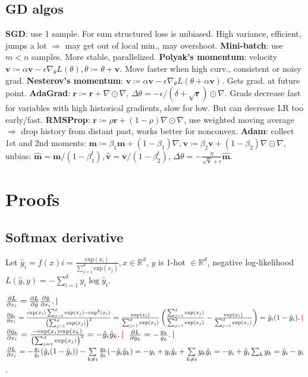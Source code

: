 \documentclass[11pt,landscape,a4paper,fleqn]{article}
\newcommand{\R}{\mathbb{R}}
\renewcommand{\exp}{\mathrm{exp}}
\newcommand{\sep}{\,\textcolor{red}{\bm|}\,}
\def\myvector#1{\mathbf{#1}}
\def\vm{{\myvector{m}}}
\def\vr{{\myvector{r}}}
\def\vv{{\myvector{v}}}
\begin{document}
\begin{multicols*}{4}
\subsection{GD algos}

\textbf{SGD}: use 1 sample.
For sum structured loss is unbiased.
High variance, efficient, jumps a lot $ \Rightarrow $ may get out of local min.,
may overshoot.
\textbf{Mini-batch}: use $m < n$ samples.
More stable, parallelized.
\textbf{Polyak's momentum}: velocity $\vv \coloneqq \alpha \vv - \epsilon \nabla_\theta L(\theta), \theta \coloneqq \theta + \vv$.
Move faster when high curv., consistent or noisy grad.
\textbf{Nesterov's momentum}: $\vv \coloneqq \alpha \vv - \epsilon \nabla_\theta L(\theta + \alpha \vv)$.
Gets grad. at future point.
\textbf{AdaGrad}: $\vr \coloneqq \vr + \nabla \odot \nabla$, $\Delta \theta = - \epsilon / (\delta + \sqrt{\vr})
\odot \nabla$.
Grads decrease fast for variables with high historical gradients,
slow for low. But can decrease LR too early/fast.
\textbf{RMSProp}: $\vr \coloneqq \rho \vr + (1 - \rho) \nabla \odot \nabla$,
use weighted moving average $ \Rightarrow $ drop history from distant past,
works better for nonconvex.
\textbf{Adam}: collect 1st and 2nd moments:
$\vm \coloneqq \beta_1 \vm + (1 - \beta_1) \nabla, \vv \coloneqq \beta_2 \vv + (1 - \beta_2) \nabla \odot \nabla$,
unbias:
$\hat{\vm} = \vm / (1 - \beta_1^t), \hat{\vv} = \vv / (1 - \beta_2^t)$,
$\Delta \theta =- \frac{\eta}{\sqrt{\hat{\vv}} + \epsilon}\hat{\vm}$.



\section{Proofs}

\subsection*{Softmax derivative}

Let $\hat{y}_i = f(x)i = \frac{\exp(x_i)}{\sum_{j = 1}^d \exp(x_j)}, x \in \R^d$,
$y$ is 1-hot $\in \R^d$,
negative log-likelihood
$L(\hat{y}, y) = - \sum_{i = 1}^d y_i \log \hat{y}_i$.

$\pdv{L}{x_i} = \pdv{L}{\hat{y}} \pdv{\hat{y}}{x_i}.\sep$
$\pdv{\hat{y}_i}{x_i} = \frac{\exp(x_i) \sum_{j = 1}^d \exp(x_j) - \exp^2(x_i)}{\left(\sum_{j = 1}^d \exp(x_j)\right)^2}
= \frac{\exp(x_i)}{\sum_{j = 1}^d \exp(x_j)} \left(\frac{\sum_{j = 1}^d \exp(x_j)}{\sum_{j = 1}^d \exp(x_j)} - \frac{\exp(x_i)}{\sum_{j = 1}^d \exp(x_j)}\right) = \hat{y}_i(1 - \hat{y}_i). \sep$
$\pdv{\hat{y}_k}{x_i} = \frac{ - \exp(x_i)\exp(x_k)}{\left(\sum_{j = 1}^d \exp(x_j)\right)^2} = - \hat{y}_i \hat{y}_k.\sep$
$\pdv{L}{\hat{y}_k} = - \frac{y_k}{\hat{y}_k}. \sep$
$\pdv{L}{x_i} = - \frac{y_i}{\hat{y}_i} (\hat{y}_i(1 - \hat{y}_i)) - \sum\limits_{k \neq i} \frac{y_k}{\hat{y}_k}( - \hat{y}_i \hat{y}_k) = - y_i + y_i \hat{y}_i + \sum\limits_{k \neq i} y_k \hat{y}_i
= - y_i + \hat{y}_i \sum_k y_k = \hat{y}_i - y_i$.


\end{multicols*}
\end{document}
